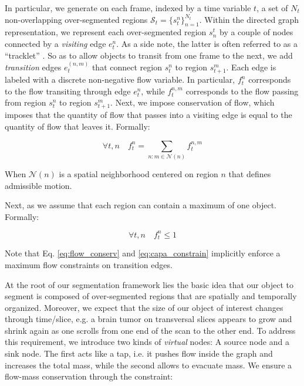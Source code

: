 In particular, we generate on each frame, indexed by a time variable $t$, a set of $N_{t}$ non-overlapping over-segmented regions $\mathcal{S}_{t}=\{s_{t}^{n}\}_{n=1}^{N_{t}}$.
Within the directed graph representation, we represent each over-segmented region $s^{t}_{n}$ by a couple of nodes connected by a \textit{visiting} edge $e^{n}_{t}$.
As a side note, the latter is often referred to as a ``tracklet'' \cite{zhang08}.
So as to allow objects to transit from one frame to the next, we add \textit{transition} edges $e^{(n,m)}_{t}$ that connect region $s^{n}_{t}$ to region $s^{m}_{t+1}$.
Each edge is labeled with a discrete non-negative flow variable.
In particular, $f_{t}^{n}$ corresponds to the flow transiting through edge $e_{t}^{n}$, while $f_{t}^{n,m}$ corresponds to the flow passing from region $s_{t}^{n}$ to region $s_{t+1}^{m}$.
Next, we impose conservation of flow, which imposes that the quantity of flow that passes into a visiting edge is equal to the quantity of flow that leaves it. Formally:

\begin{equation}
  \label{eq:flow_conserv}
  \forall t,n \quad f_{t}^{n} = \sum_{n:m\in \mathcal{N}(n)}f_{t}^{n,m}
\end{equation}

When $\mathcal{N}(n)$ is a spatial neighborhood centered on region $n$ that defines admissible motion.

Next, as we assume that each region can contain a maximum of one object. Formally:

\begin{equation}
  \label{eq:capa_constrain}
  \forall t,n \quad f_{t}^{n} \leq 1
\end{equation}

Note that Eq. \ref{eq:flow_conserv} and \ref{eq:capa_constrain} implicitly enforce a maximum flow constraints on transition edges.

At the root of our segmentation framework lies the basic idea that our object to segment is composed of over-segmented regions that are spatially and temporally organized.
Moreover, we expect that the size of our object of interest changes through time/slice, e.g. a brain tumor on transversal slices appears to grow and shrink again as one scrolls from one end of the scan to the other end.
To address this requirement, we introduce two kinds of \textit{virtual} nodes: A source node and a sink node.
The first acts like a tap, i.e. it pushes flow inside the graph and increases the total mass, while the second allows to evacuate mass.
We ensure a flow-mass conservation through the constraint:

